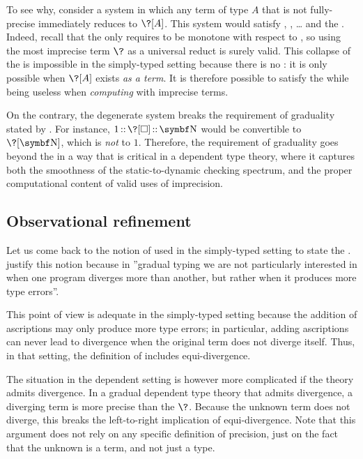 To see why, consider a system in which any term of type $A$ that is not
fully-precise immediately reduces to $\?[A]$.
This system would satisfy , , …
and the . Indeed, recall that the  only requires 
to be monotone with respect to , so using the most imprecise term
$\?$ as a universal reduct is surely valid. This collapse of the 
is impossible in the simply-typed setting because there is no :
it is only possible when $\?[A]$ exists \emph{as a term}.
It is therefore possible to satisfy the  while being useless when
\emph{computing} with imprecise terms.

On the contrary, the degenerate system breaks the  requirement of graduality stated by .
For instance, $\asc{\asc{1}{\?[\uni]}}{\Nat}$ would be convertible to $\?[\Nat]$,
which is \emph{not}  to $1$.
Therefore, the  requirement of graduality goes beyond the
 in a way that is critical in a dependent type theory,
where it captures both the smoothness of the static-to-dynamic checking spectrum,
and the proper computational content of valid uses of imprecision.

\subsection{Observational refinement}

Let us come back to the notion of  used in the simply-typed setting to state the
.
\textcite{New2018} justify this notion because in
”gradual typing we are not particularly interested in
when one program diverges more than another, but rather when it
produces more type errors”.

%
This point of view is adequate in the simply-typed setting because
the addition of ascriptions may only produce more type errors; in particular, 
adding ascriptions can never lead to divergence
when the original term does not diverge itself.
%
Thus, in that setting, the definition of 
includes equi-divergence.
%

The situation in the dependent setting is however more
complicated if the theory admits divergence.%
In a gradual dependent type theory that admits divergence,
a diverging term is more precise than the
 $\?$. Because the unknown term does not diverge, this
breaks the left-to-right implication of
equi-divergence. Note that this argument does not rely on any specific definition of precision, 
just on the fact that the unknown is a term, and not just a type.

